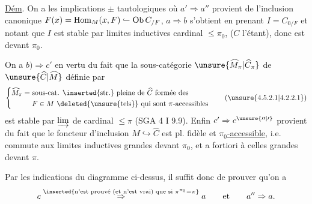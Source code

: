 \uline{Dém}. On a les implications $\pm$ tautologiques
où $a'\Rightarrow a''$ provient de l'inclusion canonique $F(x)=\operatorname{Hom}_M(x,F)\mathrel{\lhook\joinrel\relbar}\operatorname{Ob} C_{/F}$, $a\Rightarrow b$ s'obtient en prenant $I=C_{0/F}$ et notant que $I$ est stable par limites inductives   cardinal $\leq\pi_0$, ($C$ l'étant), donc est  devant $\pi_0$.

On a $b)\Rightarrow c'$ en vertu du fait que la sous-catégorie  $\unsure{\widehat M_\pi|\widehat C_\pi}$ de $\unsure{\widehat C|\widehat M}$ définie par
\[
\left\{\begin{aligned}
\widehat M_\pi={}&\text{sous-cat. \inserted{str.} pleine de }\widehat C\text{ formée des}\\
&F\in M\ \deleted{\text{\unsure{tels}}}\text{ qui sont }\pi\text{-accessibles}
\end{aligned}\right.\tag*{(\unsure{4.5.2.1|4.2.2.1})}
\]
est stable par $\varinjlim$ de cardinal $\leq\pi$ (SGA 4 I 9.9). Enfin $c'\Rightarrow c^{\unsure{\prime\prime|\prime}}$ provient du fait que le  foncteur d'inclusion $M\hookrightarrow\widehat C$ est pl. fidèle et \uline{$\pi_0$-accessible}, i.e. commute aux limites inductives grandes devant $\pi_0$, et a fortiori à celles grandes devant $\pi$.

  Par les indications du diagramme ci-dessus, il suffit donc de prouver qu'on a
\[
c\overset{\inserted{\text{n'est prouvé (et n'est vrai) que si }\pi^{\pi_0}=\pi}}{\Rightarrow} a
\qquad\text{et}\qquad a''\Rightarrow a.
\]
